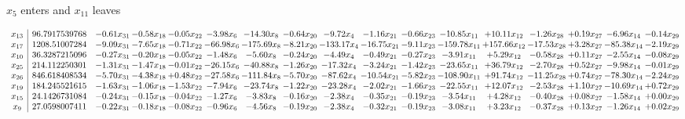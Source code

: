 \documentclass[9pt]{article}
\begin{document}
 $ x_{5} $ enters and $ x_{11} $ leaves 

 \[\begin{array}{c| c c@{\hskip 2pt} c@{\hskip 2pt} c@{\hskip 2pt} c@{\hskip 2pt} c@{\hskip 2pt} c@{\hskip 2pt} c@{\hskip 2pt} c@{\hskip 2pt} c@{\hskip 2pt} c@{\hskip 2pt} c@{\hskip 2pt} c@{\hskip 2pt} c@{\hskip 2pt} c@{\hskip 2pt} c@{\hskip 2pt} }
 x_{13}   &  96.7917539768 & -0.61 x_{31} & -0.58 x_{18} & -0.05 x_{22} & -3.98 x_{6} & -14.30 x_{8} & -0.64 x_{20} & -9.72 x_{4} & -1.16 x_{21} & -0.66 x_{23} & -10.85 x_{11} & + 10.11 x_{12} & -1.26 x_{28} & +  0.19 x_{27} & -6.96 x_{14} & -0.14 x_{29}\\
 x_{17}   &  1208.51007284 & -9.09 x_{31} & -7.65 x_{18} & -0.71 x_{22} & -66.98 x_{6} & -175.69 x_{8} & -8.21 x_{20} & -133.17 x_{4} & -16.75 x_{21} & -9.11 x_{23} & -159.78 x_{11} & + 157.66 x_{12} & -17.53 x_{28} & +  3.28 x_{27} & -85.38 x_{14} & -2.19 x_{29}\\
 x_{10}   &  36.3287215096 & -0.27 x_{31} & -0.20 x_{18} & -0.05 x_{22} & -1.48 x_{6} & -5.60 x_{8} & -0.24 x_{20} & -4.49 x_{4} & -0.49 x_{21} & -0.27 x_{23} & -3.91 x_{11} & +  5.29 x_{12} & -0.58 x_{28} & +  0.11 x_{27} & -2.55 x_{14} & -0.08 x_{29}\\
 x_{25}   &  214.112250301 & -1.31 x_{31} & -1.47 x_{18} & -0.01 x_{22} & -26.15 x_{6} & -40.88 x_{8} & -1.26 x_{20} & -17.32 x_{4} & -3.24 x_{21} & -1.42 x_{23} & -23.65 x_{11} & + 36.79 x_{12} & -2.70 x_{28} & +  0.52 x_{27} & -9.98 x_{14} & -0.01 x_{29}\\
 x_{26}   &  846.618408534 & -5.70 x_{31} & -4.38 x_{18} & +  0.48 x_{22} & -27.58 x_{6} & -111.84 x_{8} & -5.70 x_{20} & -87.62 x_{4} & -10.54 x_{21} & -5.82 x_{23} & -108.90 x_{11} & + 91.74 x_{12} & -11.25 x_{28} & +  0.74 x_{27} & -78.30 x_{14} & -2.24 x_{29}\\
 x_{19}   &  184.245521615 & -1.63 x_{31} & -1.06 x_{18} & -1.53 x_{22} & -7.94 x_{6} & -23.74 x_{8} & -1.22 x_{20} & -23.28 x_{4} & -2.02 x_{21} & -1.66 x_{23} & -22.55 x_{11} & + 12.07 x_{12} & -2.53 x_{28} & +  1.10 x_{27} & -10.69 x_{14} & +  0.72 x_{29}\\
 x_{15}   &  24.1426731084 & -0.24 x_{31} & -0.15 x_{18} & -0.04 x_{22} & -1.27 x_{6} & -3.83 x_{8} & -0.16 x_{20} & -2.38 x_{4} & -0.35 x_{21} & -0.19 x_{23} & -3.54 x_{11} & +  4.28 x_{12} & -0.40 x_{28} & +  0.08 x_{27} & -1.58 x_{14} & +  0.00 x_{29}\\
 x_{9}   &  27.0598007411 & -0.22 x_{31} & -0.18 x_{18} & -0.08 x_{22} & -0.96 x_{6} & -4.56 x_{8} & -0.19 x_{20} & -2.38 x_{4} & -0.32 x_{21} & -0.19 x_{23} & -3.08 x_{11} & +  3.23 x_{12} & -0.37 x_{28} & +  0.13 x_{27} & -1.26 x_{14} & +  0.02 x_{29}\\

\end{array}\]
\end{document}
